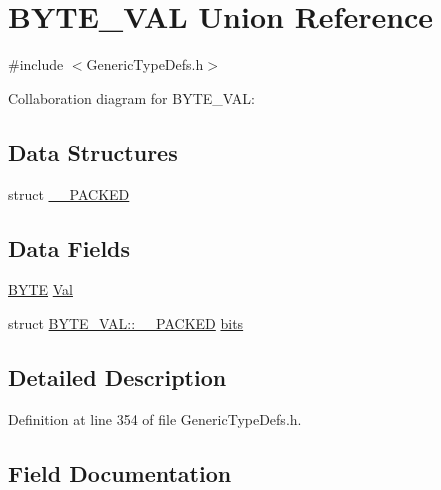 \hypertarget{union_b_y_t_e___v_a_l}{}\section{B\+Y\+T\+E\+\_\+\+V\+A\+L Union Reference}
\label{union_b_y_t_e___v_a_l}


{\ttfamily \#include $<$Generic\+Type\+Defs.\+h$>$}



Collaboration diagram for B\+Y\+T\+E\+\_\+\+V\+A\+L\+:
\subsection*{Data Structures}
\begin{DoxyCompactItemize}
\item 
struct \hyperlink{struct_b_y_t_e___v_a_l_1_1_____p_a_c_k_e_d}{\+\_\+\+\_\+\+P\+A\+C\+K\+E\+D}
\end{DoxyCompactItemize}
\subsection*{Data Fields}
\begin{DoxyCompactItemize}
\item 
\hyperlink{_generic_type_defs_8h_a4ae1dab0fb4b072a66584546209e7d58}{B\+Y\+T\+E} \hyperlink{union_b_y_t_e___v_a_l_a5ab8c2bf45b20b5f7aa3a4f083896cec}{Val}
\item 
struct \hyperlink{struct_b_y_t_e___v_a_l_1_1_____p_a_c_k_e_d}{B\+Y\+T\+E\+\_\+\+V\+A\+L\+::\+\_\+\+\_\+\+P\+A\+C\+K\+E\+D} \hyperlink{union_b_y_t_e___v_a_l_ad93fac6ba505929b26fd56008e69ee6c}{bits}
\end{DoxyCompactItemize}


\subsection{Detailed Description}


Definition at line 354 of file Generic\+Type\+Defs.\+h.



\subsection{Field Documentation}
\hypertarget{union_b_y_t_e___v_a_l_ad93fac6ba505929b26fd56008e69ee6c}{}
